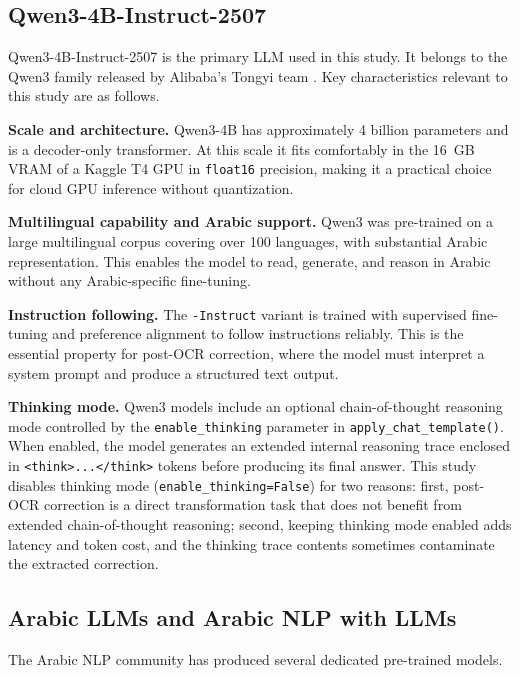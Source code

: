 \subsection{Qwen3-4B-Instruct-2507}
\label{subsec:qwen3}

Qwen3-4B-Instruct-2507 is the primary LLM used in this study.
It belongs to the Qwen3 family released by Alibaba's Tongyi team \cite{qwen3report}.
Key characteristics relevant to this study are as follows.

\textbf{Scale and architecture.}
Qwen3-4B has approximately 4 billion parameters and is a decoder-only transformer.
At this scale it fits comfortably in the 16~GB VRAM of a Kaggle T4 GPU in
\texttt{float16} precision, making it a practical choice for cloud GPU inference
without quantization.

\textbf{Multilingual capability and Arabic support.}
Qwen3 was pre-trained on a large multilingual corpus covering over 100 languages,
with substantial Arabic representation.
This enables the model to read, generate, and reason in Arabic without any
Arabic-specific fine-tuning.

\textbf{Instruction following.}
The \texttt{-Instruct} variant is trained with supervised fine-tuning and
preference alignment to follow instructions reliably.
This is the essential property for post-OCR correction, where the model must
interpret a system prompt and produce a structured text output.

\textbf{Thinking mode.}
Qwen3 models include an optional chain-of-thought reasoning mode controlled by
the \texttt{enable\_thinking} parameter in \texttt{apply\_chat\_template()}.
When enabled, the model generates an extended internal reasoning trace enclosed
in \texttt{<think>...</think>} tokens before producing its final answer.
This study disables thinking mode (\texttt{enable\_thinking=False}) for two
reasons: first, post-OCR correction is a direct transformation task that does
not benefit from extended chain-of-thought reasoning; second, keeping thinking
mode enabled adds latency and token cost, and the thinking trace contents
sometimes contaminate the extracted correction.

\subsection{Arabic LLMs and Arabic NLP with LLMs}
\label{subsec:arabic_llms}

The Arabic NLP community has produced several dedicated pre-trained models.

